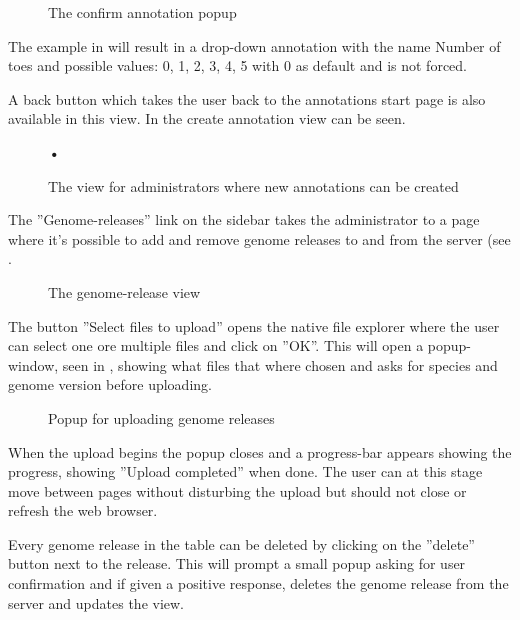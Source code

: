 \begin{figure}[h]
 \caption{The confirm annotation popup}
 \label{adm_web_createPopup}
\end{figure}

The example in  will result in a drop-down annotation with the name Number of toes and possible values: 0, 1, 2, 3, 4, 5 with 0 as default and is not forced.

A back button which takes the user back to the annotations start page is also available in this view. In  the create annotation view can be seen.

\begin{sidewaysfigure}[t]
 \textbf{•}
 \caption{The view for administrators where new annotations can be created}
 \label{adm_web_createView}
\end{sidewaysfigure}

The ''Genome-releases'' link on the sidebar takes the administrator to a page where it's possible to add and remove genome releases to and from the server (see .

\begin{sidewaysfigure}[h]
 \caption{The genome-release view}
 \label{adm_web_genomereleaseView}
\end{sidewaysfigure}

The button ''Select files to upload'' opens the native file explorer where the user can select one ore multiple files and click on ''OK''. This will open a popup-window, seen in , showing what files that where chosen and asks for species and genome version before uploading. 

\begin{figure}[h]
 \caption{Popup for uploading genome releases}
 \label{adm_web_uploadconfirm}
\end{figure}

When the upload begins the popup closes and a progress-bar appears showing the progress, showing ''Upload completed'' when done. The user can at this stage move between pages without disturbing the upload but should not close or refresh the web browser. 

Every genome release in the table can be deleted by clicking on the ''delete'' button next to the release. This will prompt a small popup asking for user confirmation and if given a positive response, deletes the genome release from the server and updates the view. 

